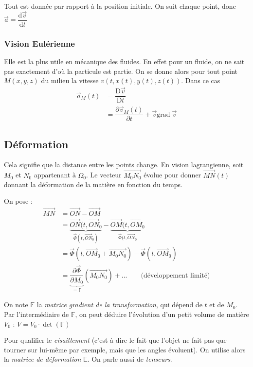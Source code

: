 \documentclass{article}
\newcommand{\deriv}{\mathrm{d}}
\newcommand{\Deriv}{\mathrm{D}}
\newcommand{\grad}{\mathrm{grad}\;}
\begin{document}
Tout est donnée par rapport à la position initiale. On suit chaque point, donc $\vec{a}=\dfrac{\deriv \vec{v}}{\deriv t}$


\subsubsection{Vision Eulérienne}
Elle est la plus utile en mécanique des fluides. En effet pour un fluide, on ne sait pas exactement d'où la particule est partie. On se donne alors pour tout point $M(x,y,z)$ du milieu la vitesse $v(t,x(t),y(t),z(t))$. Dans ce cas
\begin{align*}
\vec{a}_M (t) & = \dfrac{\Deriv \vec{v}}{\Deriv t}\\
& = \dfrac{\partial \vec{v}_M(t)}{\partial t} + \vec{v} \grad \vec{v}
\end{align*}


\subsection{Déformation}
Cela signifie que la distance entre les points change. En vision lagrangienne, soit $M_0$ et $N_0$ appartenant à $\Omega_0$. Le vecteur $\overrightarrow{M_0N_0}$ évolue pour donner $\overrightarrow{MN}(t)$ donnant la déformation de la matière en fonction du temps.

On pose :
\begin{align*}
\overrightarrow{MN} & = \overrightarrow{ON} - \overrightarrow{OM}\\
& = \underbrace{\overrightarrow{ON}(t,\overrightarrow{ON}_0}_{\vec{\Phi}(t,\overrightarrow{ON}_0)} - \underbrace{\overrightarrow{OM}(t,\overrightarrow{OM}_0}_{\vec{\Phi}(t,\overrightarrow{ON}_0}\\
& = \vec{\Phi}(t, \overrightarrow{OM}_0 + \overrightarrow{M_0N_0}) - \vec{\Phi}(t, \overrightarrow{OM}_0)\\
& = \underbrace{\dfrac{\partial \vec{\Phi}}{\partial M_0}}_{= \mathbb{F}} (\overrightarrow{M_0N_0}) + ... \qquad \text{(développement limité)}
\end{align*}

On note $\mathbb{F}$ la \emph{matrice gradient de la transformation}, qui dépend de $t$ et de $M_0$. 
Par l'intermédiaire de $\mathbb{F}$, on peut déduire l'évolution d'un petit volume de matière $V_0$ :  $V = V_0 \cdot \det (\mathbb{F})$

Pour qualifier le \emph{cisaillement} (c'est à dire le fait que l'objet ne fait pas que tourner sur lui-même par exemple, mais que les angles évoluent). On utilise alors la \emph{matrice de déformation} $\mathbb{E}$. On parle aussi de \emph{tenseurs}.
\end{document}
